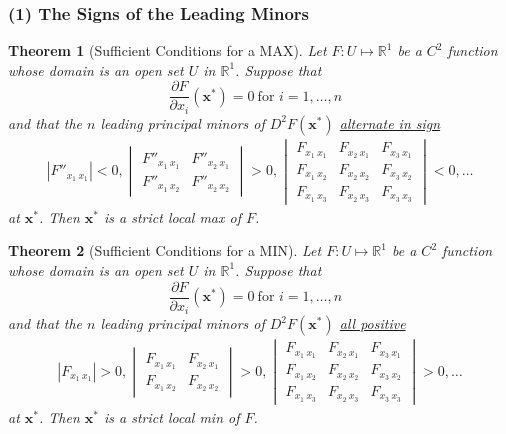\documentclass[11pt,a4paper]{book}
\newtheorem{theorem}{Theorem}[section]
\theoremstyle{definition}\newtheorem{definition}{Definition}
\theoremstyle{definition}\newtheorem{fact}{Fact}
\theoremstyle{definition}\newtheorem{remark}{Remark}
\theoremstyle{definition}\newtheorem{ex}{Ex.}
\theoremstyle{definition}\newtheorem{project}{Project}
\theoremstyle{definition}\newtheorem{problem}{Problem}
\theoremstyle{definition}\newtheorem{example}{Example}
\newenvironment{ftheorem}
{\begin{mdframed}\begin{theorem}}
		{\end{theorem}\end{mdframed}}
\numberwithin{theorem}{section}
\numberwithin{corollary}{chapter}
\numberwithin{assumption}{chapter}
\numberwithin{definition}{chapter}
\numberwithin{prop}{chapter}
\numberwithin{notation}{chapter}
\numberwithin{problem}{chapter}
\numberwithin{example}{chapter}
\numberwithin{fact}{chapter}
\numberwithin{ex}{chapter}
\def\R{\mathbb R}
\def\R{\mathbb R}
\def\x{\mathbf x}
\begin{document}
	\subsubsection{(1) The Signs of the Leading Minors}
	\begin{ftheorem}[Sufficient Conditions for a MAX]
		Let $F: U \mapsto \R^1$ be a $C^2$ function whose domain is an open set $U$ in $\R^1$. Suppose that
		\begin{equation*}
			\frac{\partial F}{\partial x_i} (\x^*) = 0 \ \text{for $i = 1, \dots, n$ }
		\end{equation*}
		and that the $n$ leading principal minors of $D^2 F(\x^*)$ \underline{alternate in sign}
		\begin{align*}
			|F''_{x_1 \ x_1}| < 0, 
			\begin{vmatrix}
				F''_{x_1 \ x_1} & F''_{x_2 \ x_1} \\
				F''_{x_1 \ x_2} & F''_{x_2 \ x_2} 
			\end{vmatrix} > 0,
			\begin{vmatrix}
				F_{x_1 \ x_1} & F_{x_2 \ x_1} & F_{x_3 \ x_1} \\
				F_{x_1 \ x_2} & F_{x_2 \ x_2} & F_{x_3 \ x_2} \\
				F_{x_1 \ x_3} & F_{x_2 \ x_3} & F_{x_3 \ x_3} 
			\end{vmatrix} < 0, \dots
		\end{align*}
		at $\x^*$. Then $\x^*$ is a strict local max of $F$.
	\end{ftheorem}
	
	\begin{ftheorem}[Sufficient Conditions for a MIN]
		Let $F: U \mapsto \R^1$ be a $C^2$ function whose domain is an open set $U$ in $\R^1$. Suppose that
		\begin{equation*}
			\frac{\partial F}{\partial x_i} (\x^*) = 0 \ \text{for $i = 1, \dots, n$ }
		\end{equation*}
		and that the $n$ leading principal minors of $D^2 F(\x^*)$ \underline{all positive}
		\begin{align*}
			|F_{x_1 \ x_1}| > 0, 
			\begin{vmatrix}
				F_{x_1 \ x_1} & F_{x_2 \ x_1} \\
				F_{x_1 \ x_2} & F_{x_2 \ x_2} 
			\end{vmatrix} > 0,
			\begin{vmatrix}
				F_{x_1 \ x_1} & F_{x_2 \ x_1} & F_{x_3 \ x_1} \\
				F_{x_1 \ x_2} & F_{x_2 \ x_2} & F_{x_3 \ x_2} \\
				F_{x_1 \ x_3} & F_{x_2 \ x_3} & F_{x_3 \ x_3} 
			\end{vmatrix} > 0, \dots
		\end{align*}
		at $\x^*$. Then $\x^*$ is a strict local min of $F$.
	\end{ftheorem}
	
\end{document}
